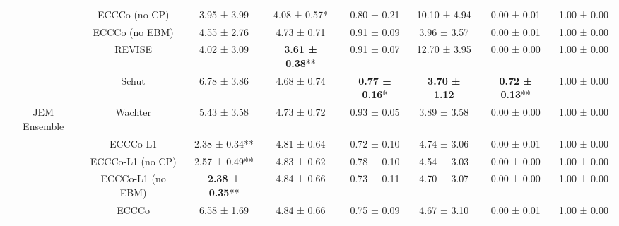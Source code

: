 \begin{table}
{\begin{tabular}[t]{cccccccc}
 & ECCCo (no CP) & 3.95 ± 3.99\hphantom{*}\hphantom{*} & 4.08 ± 0.57*\hphantom{*} & 0.80 ± 0.21\hphantom{*}\hphantom{*} & 10.10 ± 4.94\hphantom{*}\hphantom{*} & 0.00 ± 0.01\hphantom{*}\hphantom{*} & 1.00 ± 0.00\hphantom{*}\hphantom{*}\\

 & ECCCo (no EBM) & 4.55 ± 2.76\hphantom{*}\hphantom{*} & 4.73 ± 0.71\hphantom{*}\hphantom{*} & 0.91 ± 0.09\hphantom{*}\hphantom{*} & 3.96 ± 3.57\hphantom{*}\hphantom{*} & 0.00 ± 0.01\hphantom{*}\hphantom{*} & 1.00 ± 0.00\hphantom{*}\hphantom{*}\\

 & REVISE & 4.02 ± 3.09\hphantom{*}\hphantom{*} & \textbf{3.61 ± 0.38}** & 0.91 ± 0.07\hphantom{*}\hphantom{*} & 12.70 ± 3.95\hphantom{*}\hphantom{*} & 0.00 ± 0.00\hphantom{*}\hphantom{*} & 1.00 ± 0.00\hphantom{*}\hphantom{*}\\

 & Schut & 6.78 ± 3.86\hphantom{*}\hphantom{*} & 4.68 ± 0.74\hphantom{*}\hphantom{*} & \textbf{0.77 ± 0.16}*\hphantom{*} & \textbf{3.70 ± 1.12}\hphantom{*}\hphantom{*} & \textbf{0.72 ± 0.13}** & 1.00 ± 0.00\hphantom{*}\hphantom{*}\\

\multirow[t]{-10}{*}{\centering\arraybackslash JEM Ensemble} & Wachter & 5.43 ± 3.58\hphantom{*}\hphantom{*} & 4.73 ± 0.72\hphantom{*}\hphantom{*} & 0.93 ± 0.05\hphantom{*}\hphantom{*} & 3.89 ± 3.58\hphantom{*}\hphantom{*} & 0.00 ± 0.00\hphantom{*}\hphantom{*} & 1.00 ± 0.00\hphantom{*}\hphantom{*}\\
\cmidrule{1-8}
 & ECCCo-L1 & 2.38 ± 0.34** & 4.81 ± 0.64\hphantom{*}\hphantom{*} & 0.72 ± 0.10\hphantom{*}\hphantom{*} & 4.74 ± 3.06\hphantom{*}\hphantom{*} & 0.00 ± 0.01\hphantom{*}\hphantom{*} & 1.00 ± 0.00\hphantom{*}\hphantom{*}\\

 & ECCCo-L1 (no CP) & 2.57 ± 0.49** & 4.83 ± 0.62\hphantom{*}\hphantom{*} & 0.78 ± 0.10\hphantom{*}\hphantom{*} & 4.54 ± 3.03\hphantom{*}\hphantom{*} & 0.00 ± 0.00\hphantom{*}\hphantom{*} & 1.00 ± 0.00\hphantom{*}\hphantom{*}\\

 & ECCCo-L1 (no EBM) & \textbf{2.38 ± 0.35}** & 4.84 ± 0.66\hphantom{*}\hphantom{*} & 0.73 ± 0.11\hphantom{*}\hphantom{*} & 4.70 ± 3.07\hphantom{*}\hphantom{*} & 0.00 ± 0.00\hphantom{*}\hphantom{*} & 1.00 ± 0.00\hphantom{*}\hphantom{*}\\

 & ECCCo & 6.58 ± 1.69\hphantom{*}\hphantom{*} & 4.84 ± 0.66\hphantom{*}\hphantom{*} & 0.75 ± 0.09\hphantom{*}\hphantom{*} & 4.67 ± 3.10\hphantom{*}\hphantom{*} & 0.00 ± 0.01\hphantom{*}\hphantom{*} & 1.00 ± 0.00\hphantom{*}\hphantom{*}\\


\end{tabular}}
\end{table}

